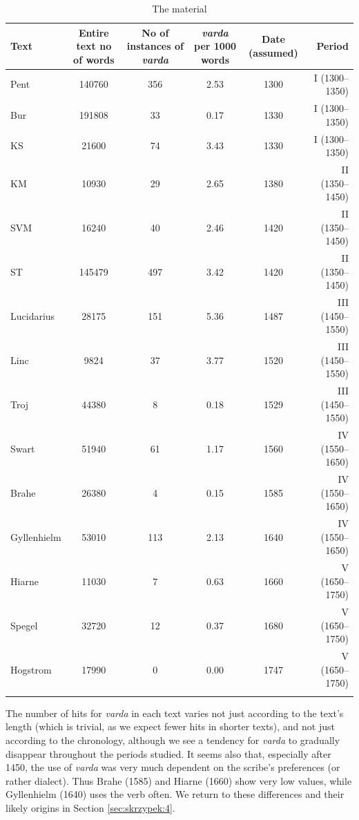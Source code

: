 \documentclass[output=paper,colorlinks,citecolor=brown]{langscibook}
\begin{document}
\begin{table}
\caption{The material}
\label{tab:skrzypek:2}
\scriptsize
\begin{tabularx}{\textwidth}{lCCC c r}
  \lsptoprule
  {Text} & {Entire text no of words} & {No of instances of \textit{varda}} & {\textit{varda} per 1000 words} & {Date (assumed)} & {Period} \\
  \midrule
  Pent & 140760 & 356 & 2.53 & 1300 & I (1300--1350) \\
  Bur & 191808 & 33 & 0.17 & 1330 & I (1300--1350) \\
  KS & 21600 & 74 & 3.43 & 1330 & I (1300--1350) \\
  KM & 10930 & 29 & 2.65 & 1380 & II (1350--1450) \\
  SVM & 16240 & 40 & 2.46 & 1420 & II (1350--1450) \\
  ST & 145479 & 497 & 3.42 & 1420 & II (1350--1450) \\
  Lucidarius & 28175 & 151 & 5.36 & 1487 & III (1450--1550) \\
  Linc & 9824 & 37 & 3.77 & 1520 & III (1450--1550) \\
  Troj & 44380 & 8 & 0.18 & 1529 & III (1450--1550) \\
  Swart & 51940 & 61 & 1.17 & 1560 & IV (1550--1650) \\
  Brahe & 26380 & 4 & 0.15 & 1585 & IV (1550--1650) \\
  Gyllenhielm & 53010 & 113 & 2.13 & 1640 & IV (1550--1650) \\
  Hiarne & 11030 & 7 & 0.63 & 1660 & V (1650--1750) \\
  Spegel & 32720 & 12 & 0.37 & 1680 & V (1650--1750) \\
  Hogstrom & 17990 & 0 & 0.00 & 1747 & V (1650--1750) \\
  \lspbottomrule
\end{tabularx}
\end{table}

The number of hits for \textit{varda} in each text varies not just according to the text’s length (which is trivial, as we expect fewer hits in shorter texts), and not just according to the chronology, although we see a tendency for \textit{varda} to gradually disappear throughout the periods studied. It seems also that, especially after 1450, the use of \textit{varda} was very much dependent on the scribe’s preferences (or rather dialect). Thus Brahe (1585) and Hiarne (1660) show very low values, while Gyllenhielm (1640) uses the verb often. We return to these differences and their likely origins in Section \ref{sec:skrzypek:4}. 
\end{document}
